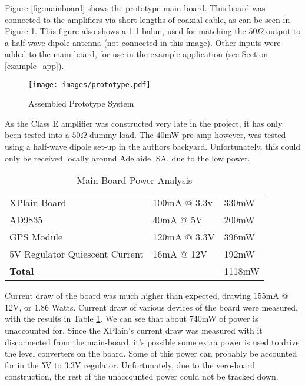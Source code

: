 \documentclass[a4paper,12pt]{article}
\begin{document}
Figure \ref{fig:mainboard} shows the prototype main-board. This board was connected to the amplifiers via short lengths of coaxial cable, as can be seen in Figure \ref{fig:prototype}. This figure also shows a 1:1 balun, used for matching the $50\Omega$ output to a half-wave dipole antenna (not connected in this image). Other inputs were added to the main-board, for use in the example application (see Section \ref{example_app}).

\begin{figure}[h]
  \begin{center}
    \texttt{[image: images/prototype.pdf]}
  \end{center}
  \caption{Assembled Prototype System}
  \label{fig:prototype}
\end{figure}

As the Class E amplifier was constructed very late in the project, it has only been tested into a $50\Omega$ dummy load. The 40mW pre-amp however, was tested using a half-wave dipole set-up in the authors backyard. Unfortunately, this could only be received locally around Adelaide, SA, due to the low power.

\begin{table}[h]
\begin{center}
\caption{Main-Board Power Analysis}
\begin{tabular}{l|l|l}
XPlain Board & 100mA @ 3.3v & 330mW\\
AD9835 & 40mA @ 5V & 200mW\\
GPS Module & 120mA @ 3.3V & 396mW\\
5V Regulator Quiescent Current & 16mA @ 12V & 192mW\\
\hline
\textbf{Total} & & 1118mW\\
\end{tabular}
\end{center}
\label{table:mainboard_power}
\end{table}

Current draw of the board was much higher than expected, drawing 155mA @ 12V, or 1.86 Watts. Current draw of various devices of the board were measured, with the results in Table \ref{table:mainboard_power}. We can see that about 740mW of power is unaccounted for. 
Since the XPlain's current draw was measured with it disconnected from the main-board, it's possible some extra power is used to drive the level converters on the board. Some of this power can probably be accounted for in the 5V to 3.3V regulator. Unfortunately, due to the vero-board construction, the rest of the unaccounted power could not be tracked down.
\end{document}
